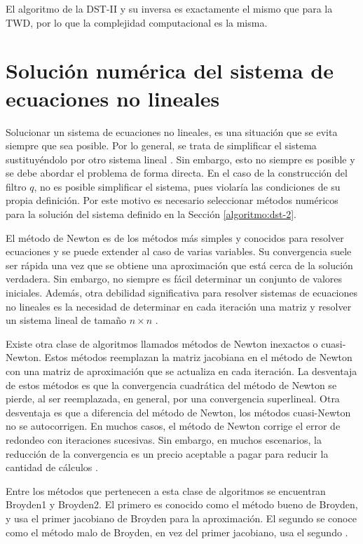 El algoritmo de la DST-II y su inversa es exactamente el mismo que para la TWD, por lo que la complejidad computacional
es la misma.

\section{Solución numérica del sistema de ecuaciones no lineales}\label{numerical-solution}

Solucionar un sistema de ecuaciones no lineales, es una situación que se evita siempre que sea 
posible. Por lo general, se trata de simplificar el sistema sustituyéndolo por otro sistema 
lineal \cite{Burden2016}. Sin embargo, esto no siempre es posible y se debe abordar el problema de
forma directa. En el caso de la construcción del filtro $q$, no es posible simplificar el sistema, pues violaría
las condiciones de su propia definición. Por este motivo es necesario seleccionar métodos numéricos para la
solución del sistema definido en la Sección \ref{algoritmo:dst-2}.

El método de Newton es de los métodos más simples y conocidos para resolver ecuaciones y se 
puede extender al caso de varias
variables. Su convergencia suele ser rápida una vez que se obtiene una aproximación que está cerca de la solución
verdadera. Sin embargo, no siempre es fácil determinar un conjunto de valores iniciales. Además, otra debilidad
significativa para resolver sistemas de ecuaciones no lineales es la necesidad de determinar en cada iteración 
una matriz y resolver un sistema lineal de tamaño $n\times n$ \cite{Burden2016}. 

Existe otra clase de algoritmos llamados métodos de Newton inexactos o cuasi-Newton. Estos métodos reemplazan la
matriz jacobiana en el método de Newton con una matriz de aproximación que se actualiza en 
cada iteración. La desventaja de estos métodos es que la convergencia cuadrática del método de Newton se pierde,
al ser reemplazada, en general, por una convergencia superlineal. Otra desventaja es que a diferencia 
del método de Newton, los métodos cuasi-Newton no se autocorrigen. En muchos casos, el método de Newton
corrige el error de redondeo con iteraciones sucesivas. Sin embargo, en muchos escenarios, la reducción 
de la convergencia es un precio aceptable a pagar para reducir la cantidad de cálculos \cite{Burden2016}. 

Entre los métodos que pertenecen a esta clase de algoritmos se encuentran Broyden1 y Broyden2. El primero es conocido
como el método bueno de Broyden, y usa el primer jacobiano de Broyden para la aproximación. El segundo se conoce
como el método malo de Broyden, en vez del primer jacobiano, usa el segundo \cite{broyden}.

